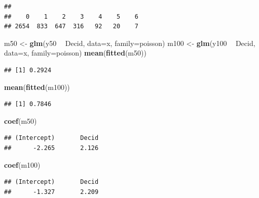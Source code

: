\documentclass[12pt,]{book}
\newenvironment{Shaded}{\begin{snugshade}}{\end{snugshade}}
\newcommand{\DataTypeTok}[1]{\textcolor[rgb]{0.13,0.29,0.53}{#1}}
\newcommand{\KeywordTok}[1]{\textcolor[rgb]{0.13,0.29,0.53}{\textbf{#1}}}
\newcommand{\NormalTok}[1]{#1}
\newcommand{\OperatorTok}[1]{\textcolor[rgb]{0.81,0.36,0.00}{\textbf{#1}}}
\newcommand{\StringTok}[1]{\textcolor[rgb]{0.31,0.60,0.02}{#1}}
\begin{document}
\begin{verbatim}
## 
##    0    1    2    3    4    5    6 
## 2654  833  647  316   92   20    7
\end{verbatim}

\begin{Shaded}
\begin{Highlighting}[]
\NormalTok{m50 <-}\StringTok{ }\KeywordTok{glm}\NormalTok{(y50 }\OperatorTok{~}\StringTok{ }\NormalTok{Decid, }\DataTypeTok{data=}\NormalTok{x, }\DataTypeTok{family=}\NormalTok{poisson)}
\NormalTok{m100 <-}\StringTok{ }\KeywordTok{glm}\NormalTok{(y100 }\OperatorTok{~}\StringTok{ }\NormalTok{Decid, }\DataTypeTok{data=}\NormalTok{x, }\DataTypeTok{family=}\NormalTok{poisson)}
\KeywordTok{mean}\NormalTok{(}\KeywordTok{fitted}\NormalTok{(m50))}
\end{Highlighting}
\end{Shaded}

\begin{verbatim}
## [1] 0.2924
\end{verbatim}

\begin{Shaded}
\begin{Highlighting}[]
\KeywordTok{mean}\NormalTok{(}\KeywordTok{fitted}\NormalTok{(m100))}
\end{Highlighting}
\end{Shaded}

\begin{verbatim}
## [1] 0.7846
\end{verbatim}

\begin{Shaded}
\begin{Highlighting}[]
\KeywordTok{coef}\NormalTok{(m50)}
\end{Highlighting}
\end{Shaded}

\begin{verbatim}
## (Intercept)       Decid 
##      -2.265       2.126
\end{verbatim}

\begin{Shaded}
\begin{Highlighting}[]
\KeywordTok{coef}\NormalTok{(m100)}
\end{Highlighting}
\end{Shaded}

\begin{verbatim}
## (Intercept)       Decid 
##      -1.327       2.209
\end{verbatim}
\end{document}
